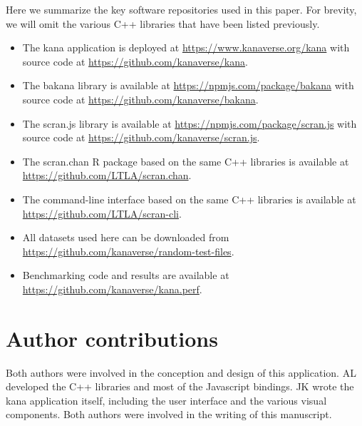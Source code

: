 \documentclass{article}
\begin{document}
Here we summarize the key software repositories used in this paper.
For brevity, we will omit the various C++ libraries that have been listed previously.

\begin{itemize}
\item The kana application is deployed at \url{https://www.kanaverse.org/kana} with source code at \url{https://github.com/kanaverse/kana}.
\item The bakana library is available at \url{https://npmjs.com/package/bakana} with source code at \url{https://github.com/kanaverse/bakana}.
\item The scran.js library is available at \url{https://npmjs.com/package/scran.js} with source code at \url{https://github.com/kanaverse/scran.js}.
\item The scran.chan R package based on the same C++ libraries is available at \url{https://github.com/LTLA/scran.chan}.
\item The command-line interface based on the same C++ libraries is available at \url{https://github.com/LTLA/scran-cli}.
\item All datasets used here can be downloaded from \url{https://github.com/kanaverse/random-test-files}.
\item Benchmarking code and results are available at \url{https://github.com/kanaverse/kana.perf}.
\end{itemize}

\section{Author contributions}
Both authors were involved in the conception and design of this application.
AL developed the C++ libraries and most of the Javascript bindings.
JK wrote the kana application itself, including the user interface and the various visual components.
Both authors were involved in the writing of this manuscript.



\end{document}
